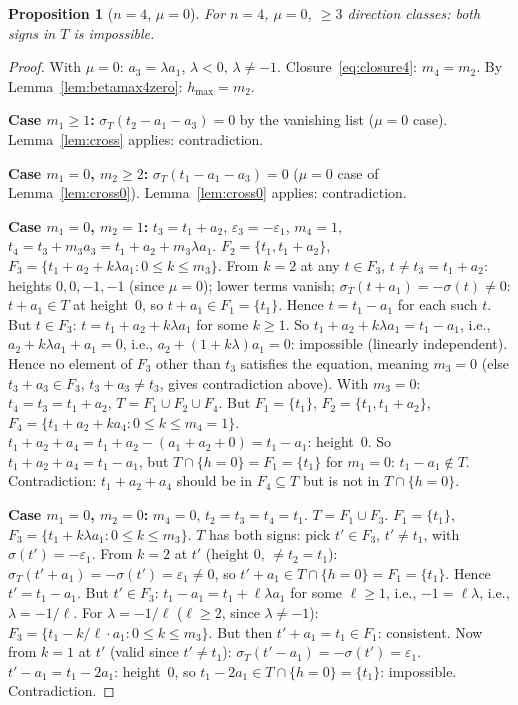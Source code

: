 \documentclass{article}
\newtheorem{prop}{Proposition}
\begin{document}
\begin{prop}[$n=4$, $\mu=0$]\label{prop:n4mu0}
For $n=4$, $\mu=0$, $\ge 3$ direction classes:
both signs in $T$ is impossible.
\end{prop}
\begin{proof}
With $\mu=0$: $a_3=\lambda a_1$, $\lambda<0$, $\lambda\ne-1$.
Closure~\eqref{eq:closure4}: $m_4=m_2$.
By Lemma~\ref{lem:betamax4zero}: $h_{\max}=m_2$.

\textbf{Case $m_1\ge 1$:}
$\sigma_T(t_2-a_1-a_3)=0$ by the vanishing list ($\mu=0$ case).
Lemma~\ref{lem:cross} applies: contradiction.

\textbf{Case $m_1=0$, $m_2\ge 2$:}
$\sigma_T(t_1-a_1-a_3)=0$ ($\mu=0$ case of Lemma~\ref{lem:cross0}).
Lemma~\ref{lem:cross0} applies: contradiction.

\textbf{Case $m_1=0$, $m_2=1$:}
$t_3=t_1+a_2$, $\varepsilon_3=-\varepsilon_1$, $m_4=1$, $t_4=t_3+m_3a_3=t_1+a_2+m_3\lambda a_1$.
$F_2=\{t_1,t_1+a_2\}$, $F_3=\{t_1+a_2+k\lambda a_1:0\le k\le m_3\}$.
From $k=2$ at any $t\in F_3$, $t\ne t_3=t_1+a_2$:
heights $0,0,-1,-1$ (since $\mu=0$); lower terms vanish;
$\sigma_T(t+a_1)=-\sigma(t)\ne 0$: $t+a_1\in T$ at height~$0$, so $t+a_1\in F_1=\{t_1\}$.
Hence $t=t_1-a_1$ for each such $t$.  But $t\in F_3$: $t=t_1+a_2+k\lambda a_1$ for some $k\ge 1$.
So $t_1+a_2+k\lambda a_1=t_1-a_1$, i.e., $a_2+k\lambda a_1+a_1=0$, i.e., $a_2+(1+k\lambda)a_1=0$: impossible (linearly independent).
Hence no element of $F_3$ other than $t_3$ satisfies the equation,
meaning $m_3=0$ (else $t_3+a_3\in F_3$, $t_3+a_3\ne t_3$, gives contradiction above).
With $m_3=0$: $t_4=t_3=t_1+a_2$, $T=F_1\cup F_2\cup F_4$.
But $F_1=\{t_1\}$, $F_2=\{t_1,t_1+a_2\}$, $F_4=\{t_1+a_2+ka_4:0\le k\le m_4=1\}$.
$t_1+a_2+a_4=t_1+a_2-(a_1+a_2+0)=t_1-a_1$: height~$0$.
So $t_1+a_2+a_4=t_1-a_1$, but $T\cap\{h=0\}=F_1=\{t_1\}$ for $m_1=0$: $t_1-a_1\notin T$.
Contradiction: $t_1+a_2+a_4$ should be in $F_4\subseteq T$ but is not in $T\cap\{h=0\}$.

\textbf{Case $m_1=0$, $m_2=0$:}
$m_4=0$, $t_2=t_3=t_4=t_1$.  $T=F_1\cup F_3$.
$F_1=\{t_1\}$, $F_3=\{t_1+k\lambda a_1:0\le k\le m_3\}$.
$T$ has both signs: pick $t'\in F_3$, $t'\ne t_1$, with $\sigma(t')=-\varepsilon_1$.
From $k=2$ at $t'$ (height $0$, $\ne t_2=t_1$):
$\sigma_T(t'+a_1)=-\sigma(t')=\varepsilon_1\ne 0$, so $t'+a_1\in T\cap\{h=0\}=F_1=\{t_1\}$.
Hence $t'=t_1-a_1$.
But $t'\in F_3$: $t_1-a_1=t_1+\ell\lambda a_1$ for some $\ell\ge 1$, i.e., $-1=\ell\lambda$, i.e., $\lambda=-1/\ell$.
For $\lambda=-1/\ell$ ($\ell\ge 2$, since $\lambda\ne-1$): $F_3=\{t_1-k/\ell\cdot a_1:0\le k\le m_3\}$.
But then $t'+a_1=t_1\in F_1$: consistent.
Now from $k=1$ at $t'$ (valid since $t'\ne t_1$): $\sigma_T(t'-a_1)=-\sigma(t')=\varepsilon_1$.
$t'-a_1=t_1-2a_1$: height~$0$, so $t_1-2a_1\in T\cap\{h=0\}=\{t_1\}$: impossible.
Contradiction.
\end{proof}
\end{document}
